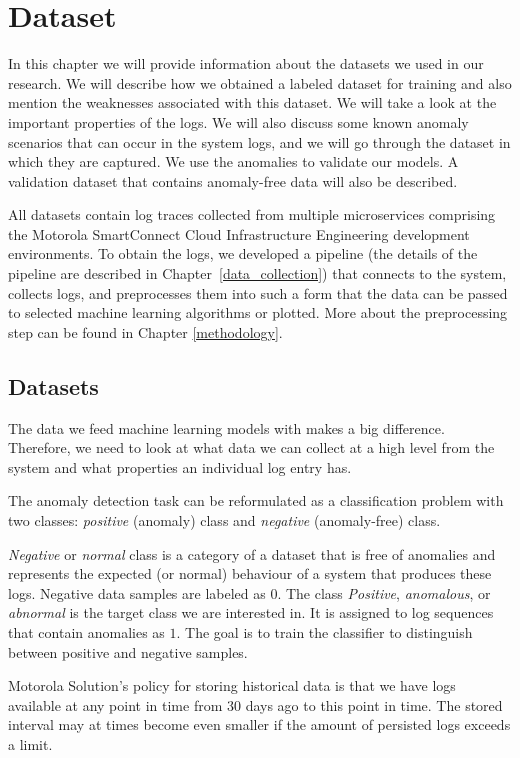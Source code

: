 \chapter{Dataset}
\label{chapter:dataset}

In this chapter we will provide information about the datasets we used in our research. We will describe how we obtained a labeled dataset for training and also mention the weaknesses associated with this dataset. We will take a look at the important properties of the logs. 
We will also discuss some known anomaly scenarios that can occur in the system logs, and we will go through the dataset in which they are captured. 
We use the anomalies to validate our models. A validation dataset that contains anomaly-free data will also be described. 

All datasets contain log traces collected from multiple microservices comprising the Motorola SmartConnect Cloud Infrastructure Engineering development environments.
To obtain the logs, we developed a pipeline (the details of the pipeline are described in Chapter~\ref{data_collection}) that connects to the system, collects logs, and preprocesses them into such a form that the data can be passed to selected machine learning algorithms or plotted.
More about the preprocessing step can be found in Chapter \ref{methodology}.

\section{Datasets}
\label{dataset}
The data we feed machine learning models with makes a big difference. Therefore, we need to look at what data we can collect at a high level from the system and what properties an individual log entry has.

The anomaly detection task can be reformulated as a classification problem with two classes: \textit{positive} (anomaly) class and \textit{negative} (anomaly-free) class. 

\textit{Negative} or \textit{normal} class is a category of a dataset that is free of anomalies and represents the expected (or normal) behaviour of a system that produces these logs. Negative data samples are labeled as $0$. The class \textit{Positive}, \textit{anomalous}, or \textit{abnormal} is the target class we are interested in. It is assigned to log sequences that contain anomalies as $1$. The goal is to train the classifier to distinguish between positive and negative samples.

Motorola Solution's policy for storing historical data is that we have logs available at any point in time from $30$ days ago to this point in time. The stored interval may at times become even smaller if the amount of persisted logs exceeds a limit.

